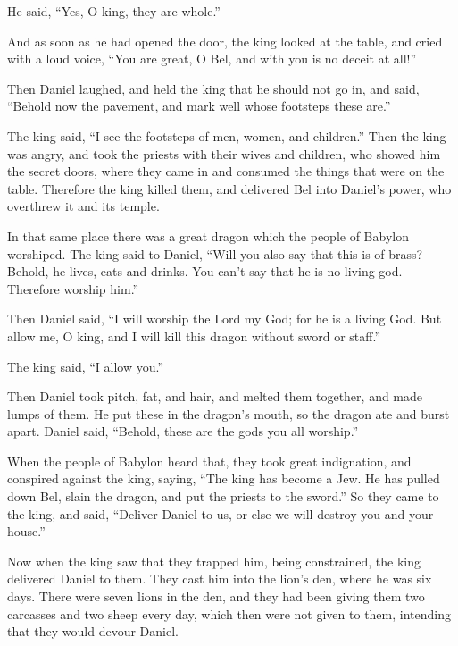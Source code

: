 He said, ``Yes, O king, they are whole.''

 And as soon as he had opened the door, the king looked
at the table, and cried with a loud voice, ``You are great, O Bel, and
with you is no deceit at all!''

 Then Daniel laughed, and held the king that he should
not go in, and said, ``Behold now the pavement, and mark well whose
footsteps these are.''

 The king said, ``I see the footsteps of men, women, and
children.'' Then the king was angry,  and took the
priests with their wives and children, who showed him the secret doors,
where they came in and consumed the things that were on the table.
 Therefore the king killed them, and delivered Bel into
Daniel's power, who overthrew it and its temple.

 In that same place there was a great dragon which the
people of Babylon worshiped.  The king said to Daniel,
``Will you also say that this is of brass? Behold, he lives, eats and
drinks. You can't say that he is no living god. Therefore worship him.''

 Then Daniel said, ``I will worship the Lord my God; for
he is a living God.  But allow me, O king, and I will
kill this dragon without sword or staff.''

The king said, ``I allow you.''

 Then Daniel took pitch, fat, and hair, and melted them
together, and made lumps of them. He put these in the dragon's mouth, so
the dragon ate and burst apart. Daniel said, ``Behold, these are the
gods you all worship.''

 When the people of Babylon heard that, they took great
indignation, and conspired against the king, saying, ``The king has
become a Jew. He has pulled down Bel, slain the dragon, and put the
priests to the sword.''  So they came to the king, and
said, ``Deliver Daniel to us, or else we will destroy you and your
house.''

 Now when the king saw that they trapped him, being
constrained, the king delivered Daniel to them.  They
cast him into the lion's den, where he was six days. 
There were seven lions in the den, and they had been giving them two
carcasses and two sheep every day, which then were not given to them,
intending that they would devour Daniel.

